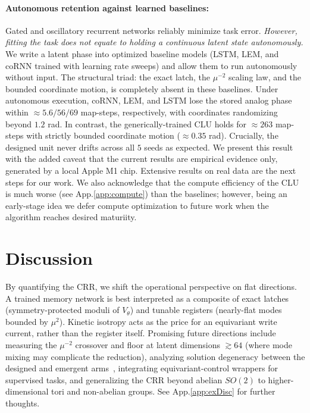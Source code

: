 \documentclass[mlabstract,onecolumn]{jmlr}
\begin{document}
\paragraph{Autonomous retention against learned baselines:} Gated and oscillatory recurrent networks reliably minimize task error. \emph{However, fitting the task does not equate to holding a continuous latent state autonomously.} We write a latent phase into optimized baseline models (LSTM, LEM, and coRNN trained with learning rate sweeps) and allow them to run autonomously without input. The structural triad: the exact latch, the $\mu^{-2}$ scaling law, and the bounded coordinate motion, is completely absent in these baselines. Under autonomous execution, coRNN, LEM, and LSTM lose the stored analog phase within $\approx5.6/56/69$ map-steps, respectively, with coordinates randomizing beyond $1.2$ rad. In contrast, the generically-trained CLU holds for $\approx263$ map-steps with strictly bounded coordinate motion ($\approx0.35$ rad). Crucially, the designed unit never drifts across all $5$ seeds as expected. We present this result with the added caveat that the current results are empirical evidence only, generated by a local Apple M1 chip. Extensive results on real data are the next steps for our work. We also acknowledge that the compute efficiency of the CLU is much worse (see App.\ref{app:compute}) than the baselines; however, being an early-stage idea we defer compute optimization to future work when the algorithm reaches desired maturiity.

\section{Discussion}\label{sec:discussion}

By quantifying the CRR, we shift the operational perspective on flat directions. A trained memory network is best interpreted as a composite of exact latches (symmetry-protected moduli of $V_\theta$) and tunable registers (nearly-flat modes bounded by $\mu^2$). Kinetic isotropy acts as the price for an equivariant write current, rather than the register itself. Promising future directions include measuring the $\mu^{-2}$ crossover and floor at latent dimensions $\gtrsim64$ (where mode mixing may complicate the reduction), analyzing solution degeneracy between the designed and emergent arms~\citep{huang_measuring_2025}, integrating equivariant-control wrappers for supervised tasks, and generalizing the CRR beyond abelian $SO(2)$ to higher-dimensional tori and non-abelian groups. See App.\ref{app:exDisc} for further thoughts.
\end{document}
